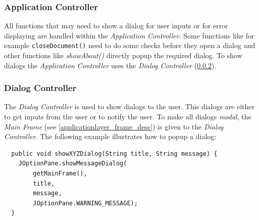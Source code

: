 \subsubsection{Application Controller}
All functions that may need to show a dialog for user inputs or for error displaying are handled within the \textit{Application Controller}. Some functions like for example \texttt{closeDocument()} need to do some checks before they open a dialog and other functions like \textit{showAbout()} directly popup the required dialog. To show dialogs the \textit{Application Controller} uses the \textit{Dialog Controller} (\ref{applicationlayer_dialogcontroller}).

\subsubsection{Dialog Controller}
\label{applicationlayer_dialogcontroller}
The \textit{Dialog Controller} is used to show dialogs to the user. This dialogs are either to get inputs from the user or to notify the user. To make all dialogs \textit{modal}, the \textit{Main Frame} (see \ref{applicationlayer_frame_desc}) is given to the \textit{Dialog Controller}. The following example illustrates how to popup a dialog:
\begin{verbatim}
  public void showXYZDialog(String title, String message) {
    JOptionPane.showMessageDialog(
        getMainFrame(),
        title,
        message,
        JOptionPane.WARNING_MESSAGE);
  }
\end{verbatim}



